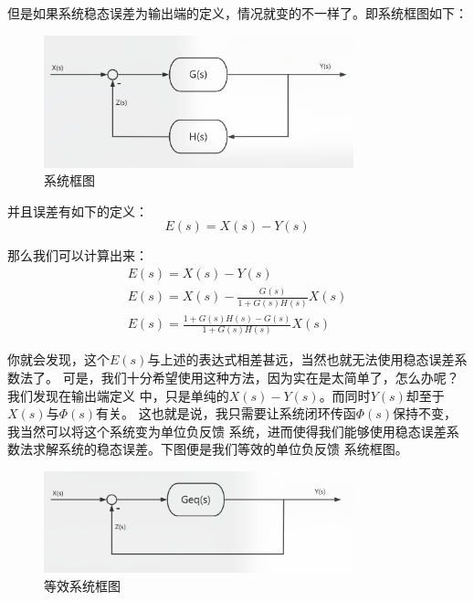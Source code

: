 \documentclass{ctexart}
\begin{document}
但是如果系统稳态误差为输出端的定义，情况就变的不一样了。即系统框图如下：
\begin{figure}[H]
    \centering
    \includegraphics[width=0.8\textwidth]{./pics/steady_state_error/sys1.png}
    \caption{系统框图}
    \label{Fig.2}
\end{figure}
并且误差有如下的定义：
\begin{equation}
    E(s) = X(s) - Y(s)
\end{equation}

那么我们可以计算出来：
\begin{gather}
    E(s) = X(s) - Y(s) \\
    E(s) = X(s) - \frac{G(s)}{1 + G(s)H(s)} X(s) \\
    E(s) = \frac{1 + G(s)H(s) - G(s)}{1 + G(s)H(s)} X(s)
\end{gather}

你就会发现，这个$E(s)$与上述的表达式相差甚远，当然也就无法使用稳态误差系数法了。
可是，我们十分希望使用这种方法，因为实在是太简单了，怎么办呢？我们发现在输出端定义
中，只是单纯的$X(s) - Y(s)$。而同时$Y(s)$却至于$X(s)$与$\Phi(s)$有关。
这也就是说，我只需要让系统闭环传函$\Phi(s)$保持不变，我当然可以将这个系统变为单位负反馈
系统，进而使得我们能够使用稳态误差系数法求解系统的稳态误差。下图便是我们等效的单位负反馈
系统框图。
\begin{figure}[H]
    \centering
    \includegraphics[width=0.8\textwidth]{./pics/steady_state_error/eq_sys.png}
    \caption{等效系统框图}
    \label{Fig.3}
\end{figure}
\end{document}

